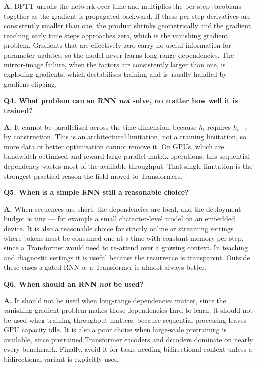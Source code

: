 \documentclass[11pt]{article}
\begin{document}
\noindent\textbf{A.} BPTT unrolls the network over time and multiplies the per-step Jacobians together as the gradient is propagated backward. If those per-step derivatives are consistently smaller than one, the product shrinks geometrically and the gradient reaching early time steps approaches zero, which is the vanishing gradient problem. Gradients that are effectively zero carry no useful information for parameter updates, so the model never learns long-range dependencies. The mirror-image failure, when the factors are consistently larger than one, is exploding gradients, which destabilises training and is usually handled by gradient clipping.

\medskip
\noindent\textbf{Q4. What problem can an RNN \emph{not} solve, no matter how well it is trained?}

\noindent\textbf{A.} It cannot be parallelised across the time dimension, because $h_t$ requires $h_{t-1}$ by construction. This is an architectural limitation, not a training limitation, so more data or better optimisation cannot remove it. On GPUs, which are bandwidth-optimised and reward large parallel matrix operations, this sequential dependency wastes most of the available throughput. That single limitation is the strongest practical reason the field moved to Transformers.

\medskip
\noindent\textbf{Q5. When is a simple RNN still a reasonable choice?}

\noindent\textbf{A.} When sequences are short, the dependencies are local, and the deployment budget is tiny --- for example a small character-level model on an embedded device. It is also a reasonable choice for strictly online or streaming settings where tokens must be consumed one at a time with constant memory per step, since a Transformer would need to re-attend over a growing context. In teaching and diagnostic settings it is useful because the recurrence is transparent. Outside these cases a gated RNN or a Transformer is almost always better.

\medskip
\noindent\textbf{Q6. When should an RNN \emph{not} be used?}

\noindent\textbf{A.} It should not be used when long-range dependencies matter, since the vanishing gradient problem makes those dependencies hard to learn. It should not be used when training throughput matters, because sequential processing leaves GPU capacity idle. It is also a poor choice when large-scale pretraining is available, since pretrained Transformer encoders and decoders dominate on nearly every benchmark. Finally, avoid it for tasks needing bidirectional context unless a bidirectional variant is explicitly used.
\end{document}
